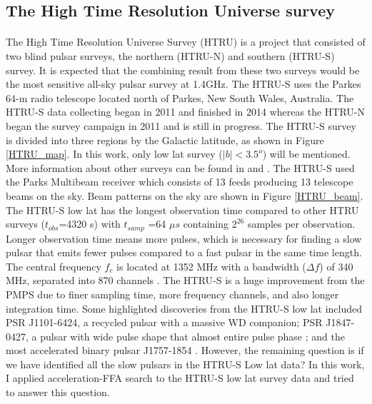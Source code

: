 \documentclass[thesis_msc.tex]{subfiles}
\begin{document}
        \subsection{The High Time Resolution Universe survey}
		\paragraph{} The High Time Resolution Universe Survey (HTRU) is a project that consisted of two blind pulsar surveys, the northern (HTRU-N) and southern (HTRU-S) survey. It is expected that the combining result from these two surveys would be the most sensitive all-sky pulsar survey at 1.4GHz. The HTRU-S uses the Parkes 64-m radio telescope located north of Parkes, New South Wales, Australia. The HTRU-S data collecting began in 2011 and finished in 2014 whereas the HTRU-N began the survey campaign in 2011 and is still in progress. The HTRU-S survey is divided into three regions by the Galactic latitude, as shown in Figure \ref{HTRU_map}. In this work, only low lat survey ($|b|<3.5^o$) will be mentioned. More information about other surveys can be found in \cite{Andrew} and \cite{keith2010high}. The HTRU-S used the Parks Multibeam receiver which consists of 13 feeds producing 13 telescope beams on the sky. Beam patterns on the sky are shown in Figure \ref{HTRU_beam}.  The HTRU-S low lat has the longest observation time compared to other HTRU surveys ($t_{obs}$=4320 s) with $t_{samp}$ =64 $\mu s$ containing $2^{26}$ samples per observation. Longer observation time means more pulses, which is necessary for finding a slow pulsar that emits fewer pulses compared to a fast pulsar in the same time length. The central frequency $f_c$ is located at 1352 MHz with a bandwidth ($\Delta f$) of 340 MHz, separated into 870 channels \citep{keith2010high}. The HTRU-S is a huge improvement from the PMPS due to finer sampling time, more frequency channels, and also longer integration time. Some highlighted discoveries from the HTRU-S low lat included PSR J1101-6424, a recycled pulsar with a massive WD companion; PSR J1847-0427, a pulsar with wide pulse shape that almost entire pulse phase \citep{ng2015high}; and the most accelerated binary pulsar J1757-1854 \citep{cameron2018high}. However, the remaining question is if we have identified all the slow pulsars in the HTRU-S Low lat data? In this work, I applied acceleration-FFA search to the HTRU-S low lat survey data and tried to answer this question. %
        
\end{document}
